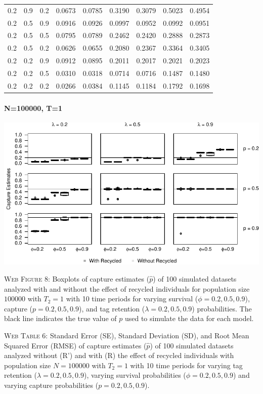 \documentclass[]{article}
\let\oldparagraph\paragraph
\renewcommand{\paragraph}[1]{\oldparagraph{#1}\mbox{}}
\begin{document}
\begin{table}[ht]
{\begin{tabular}{rrrrrrrrr}
  0.2 & 0.9 & 0.2 & 0.0673 & 0.0785 & 0.3190 & 0.3079 & 0.5023 & 0.4954 \\ 
  0.2 & 0.5 & 0.9 & 0.0916 & 0.0926 & 0.0997 & 0.0952 & 0.0992 & 0.0951 \\ 
  0.2 & 0.5 & 0.5 & 0.0795 & 0.0789 & 0.2462 & 0.2420 & 0.2888 & 0.2873 \\ 
  0.2 & 0.5 & 0.2 & 0.0626 & 0.0655 & 0.2080 & 0.2367 & 0.3364 & 0.3405 \\ 
  0.2 & 0.2 & 0.9 & 0.0912 & 0.0895 & 0.2011 & 0.2017 & 0.2021 & 0.2023 \\ 
  0.2 & 0.2 & 0.5 & 0.0310 & 0.0318 & 0.0714 & 0.0716 & 0.1487 & 0.1480 \\ 
  0.2 & 0.2 & 0.2 & 0.0266 & 0.0384 & 0.1145 & 0.1184 & 0.1792 & 0.1698 \\ 
   \hline
\end{tabular}
}
\endgroup
\end{table}

\newpage

\paragraph{N=100000, T=1}\label{n100000-t1-1}

\includegraphics{Appendix_BW_files/figure-latex/8_capture_GJSTL2-1.pdf}

\textsc{Web Figure 8:} Boxplots of capture estimates (\(\hat{p}\)) of
100 simulated datasets analyzed with and without the effect of recycled
individuals for population size \(100000\) with \(T_2=1\) with 10 time
periods for varying survival (\(\phi=0.2,0.5,0.9\)), capture
(\(p=0.2,0.5,0.9\)), and tag retention (\(\lambda=0.2,0.5,0.9\))
probabilities. The black line indicates the true value of \(p\) used to
simulate the data for each model.

\textsc{Web Table 6:} Standard Error (SE), Standard Deviation (SD), and
Root Mean Squared Error (RMSE) of capture estimates (\(\hat{p}\)) of 100
simulated datasets analyzed without (R') and with (R) the effect of
recycled individuals with population size \(N=100000\) with \(T_2=1\)
with 10 time periods for varying tag retention
(\(\lambda=0.2,0.5,0.9\)), varying survival probabilities
(\(\phi=0.2,0.5,0.9\)) and varying capture probabilities
(\(p=0.2,0.5,0.9\)).
\end{document}
